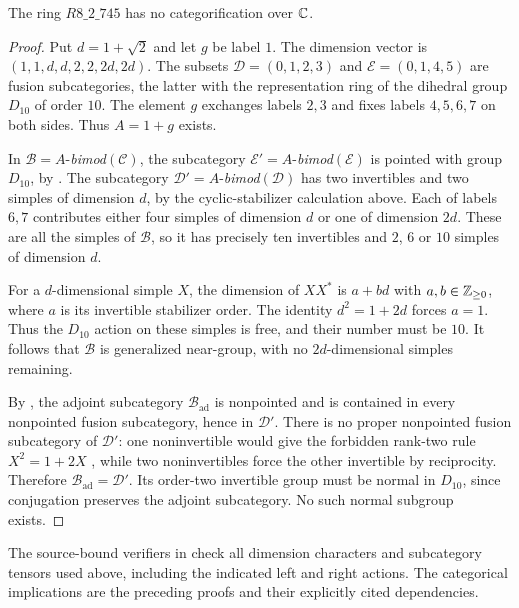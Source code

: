 \begin{proposition}\label{prop:r8-745-morita}
The ring $R8\_2\_745$ has no categorification over $\mathbb C$.
\end{proposition}
\begin{proof}
Put $d=1+\sqrt2$ and let $g$ be label $1$. The dimension vector is
$(1,1,d,d,2,2,2d,2d)$. The subsets
$\mathcal D=(0,1,2,3)$ and $\mathcal E=(0,1,4,5)$ are fusion
subcategories, the latter with the representation ring of the dihedral
group $D_{10}$ of order $10$. The element $g$ exchanges labels $2,3$
and fixes labels $4,5,6,7$ on both sides. Thus $A=1+g$ exists.

In $\mathcal B=A$-\emph{bimod}$(\mathcal C)$, the subcategory
$\mathcal E'=A$-\emph{bimod}$(\mathcal E)$ is pointed with group
$D_{10}$, by \cite[Lemma~6.2 and the proof of Theorem~6.3]{EGODimPQ}.
The subcategory $\mathcal D'=A$-\emph{bimod}$(\mathcal D)$ has two
invertibles and two simples of dimension $d$, by the cyclic-stabilizer
calculation above. Each of labels $6,7$ contributes either four
simples of dimension $d$ or one of dimension $2d$. These are all the
simples of $\mathcal B$, so it has precisely ten invertibles and
$2$, $6$ or $10$ simples of dimension $d$.

For a $d$-dimensional simple $X$, the dimension of $XX^*$ is
$a+bd$ with $a,b\in\mathbb Z_{\ge0}$, where $a$ is its invertible stabilizer order.
The identity $d^2=1+2d$ forces $a=1$. Thus the $D_{10}$ action on
these simples is free, and their number must be $10$. It follows that
$\mathcal B$ is generalized near-group, with no $2d$-dimensional
simples remaining.

By \cite[Proposition~3.6(1)]{DongSunNear}, the adjoint
subcategory $\mathcal B_{\mathrm{ad}}$ is nonpointed and is contained
in every nonpointed fusion subcategory, hence in $\mathcal D'$.
There is no proper nonpointed fusion subcategory of $\mathcal D'$:
one noninvertible would give the forbidden rank-two rule
$X^2=1+2X$ \cite{Ostrik2}, while two noninvertibles force the other
invertible by reciprocity. Therefore
$\mathcal B_{\mathrm{ad}}=\mathcal D'$. Its order-two invertible group
must be normal in $D_{10}$, since conjugation preserves the adjoint
subcategory. No such normal subgroup exists.
\end{proof}

The source-bound verifiers in
 check all dimension
characters and subcategory tensors used above, including the indicated
left and right actions. The categorical implications are the preceding
proofs and their explicitly cited dependencies.
